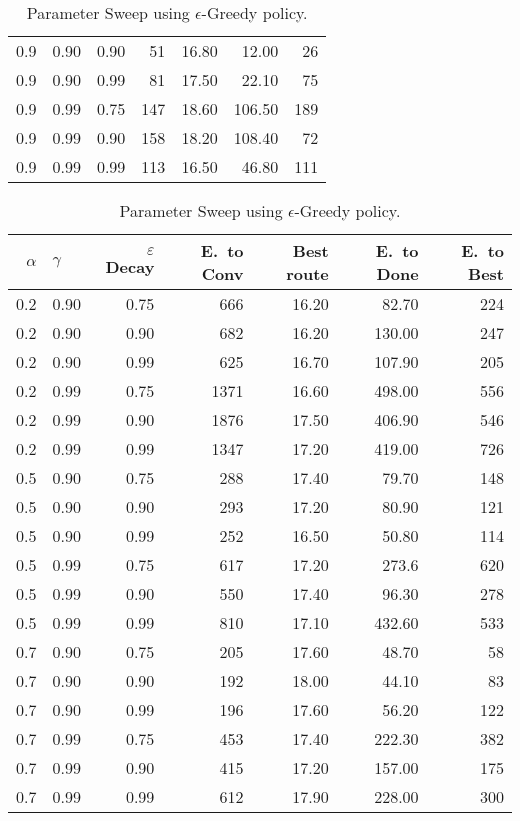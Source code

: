\begin{table}[h]
\begin{tabular}{r l r | r r r r}
		0.9 & 0.90  & 0.90 & 51  & 16.80 & 12.00  & 26 \\
		0.9 & 0.90  & 0.99 & 81  & 17.50 & 22.10  & 75 \\
		0.9 & 0.99  & 0.75 & 147 & 18.60 & 106.50 & 189 \\
		0.9 & 0.99  & 0.90 & 158 & 18.20 & 108.40 & 72 \\
		0.9 & 0.99  & 0.99 & 113 & 16.50 & 46.80  & 111 \\
		\bottomrule
	\end{tabular}
	\caption{Parameter Sweep using $\epsilon$-Greedy policy.}
	\vspace{3em}
	\begin{tabular}{r l r | r r r r}
		$\alpha$ & $\gamma$ & $\varepsilon$ Decay &
		E.\ to Conv & Best route & E.\ to Done & E.\ to Best\footnotemark[0]{} \\
		\midrule
			0.2 & 0.90 & 0.75 & 666  & 16.20 &  82.70 &  224 \\
			0.2 & 0.90 & 0.90 & 682  & 16.20 & 130.00 &  247 \\
			0.2 & 0.90 & 0.99 & 625  & 16.70 & 107.90 &  205 \\
			0.2 & 0.99 & 0.75 & 1371 & 16.60 & 498.00 &  556 \\
			0.2 & 0.99 & 0.90 & 1876 & 17.50 & 406.90 &  546 \\
			0.2 & 0.99 & 0.99 & 1347 & 17.20 & 419.00 &  726 \\
			0.5 & 0.90 & 0.75 & 288  & 17.40 &  79.70 &  148 \\
			0.5 & 0.90 & 0.90 & 293  & 17.20 &  80.90 &  121 \\
			0.5 & 0.90 & 0.99 & 252  & 16.50 &  50.80 &  114 \\
			0.5 & 0.99 & 0.75 & 617  & 17.20 &  273.6 &  620 \\
			0.5 & 0.99 & 0.90 & 550  & 17.40 &  96.30 &  278 \\
			0.5 & 0.99 & 0.99 & 810  & 17.10 & 432.60 &  533 \\
			0.7 & 0.90 & 0.75 & 205  & 17.60 &  48.70 &   58 \\
			0.7 & 0.90 & 0.90 & 192  & 18.00 &  44.10 &   83 \\
			0.7 & 0.90 & 0.99 & 196  & 17.60 &  56.20 &  122 \\
			0.7 & 0.99 & 0.75 & 453  & 17.40 & 222.30 &  382 \\
			0.7 & 0.99 & 0.90 & 415  & 17.20 & 157.00 &  175 \\
			0.7 & 0.99 & 0.99 & 612  & 17.90 & 228.00 &  300 \\

\end{tabular}
\end{table}
